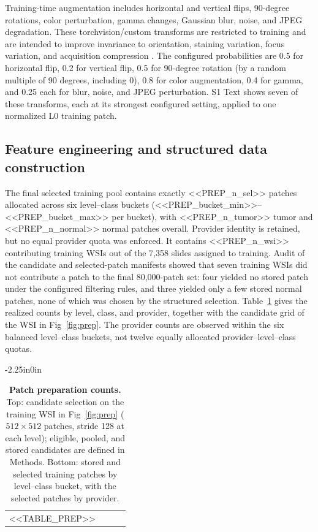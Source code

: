 \documentclass[10pt,letterpaper]{article}
\begin{document}
Training-time augmentation includes horizontal and vertical flips, 90-degree rotations, color perturbation, gamma changes, Gaussian blur, noise, and JPEG degradation. These torchvision/custom transforms are restricted to training and are intended to improve invariance to orientation, staining variation, focus variation, and acquisition compression \cite{bib24}. The configured probabilities are 0.5 for horizontal flip, 0.2 for vertical flip, 0.5 for 90-degree rotation (by a random multiple of 90 degrees, including 0), 0.8 for color augmentation, 0.4 for gamma, and 0.25 each for blur, noise, and JPEG perturbation. S1 Text shows seven of these transforms, each at its strongest configured setting, applied to one normalized L0 training patch.

\subsection*{Feature engineering and structured data construction}
The final selected training pool contains exactly <<PREP_n_sel>> patches allocated across six level--class buckets (<<PREP_bucket_min>>--<<PREP_bucket_max>> per bucket), with <<PREP_n_tumor>> tumor and <<PREP_n_normal>> normal patches overall. Provider identity is retained, but no equal provider quota was enforced. It contains <<PREP_n_wsi>> contributing training WSIs out of the 7,358 slides assigned to training. Audit of the candidate and selected-patch manifests showed that seven training WSIs did not contribute a patch to the final 80,000-patch set: four yielded no stored patch under the configured filtering rules, and three yielded only a few stored normal patches, none of which was chosen by the structured selection. Table~\ref{tab:prep} gives the realized counts by level, class, and provider, together with the candidate grid of the WSI in Fig~\ref{fig:prep}. The provider counts are observed within the six balanced level--class buckets, not twelve equally allocated provider--level--class quotas.

\begin{table}[H]\begin{adjustwidth}{-2.25in}{0in}\centering
\caption{\textbf{Patch preparation counts.} Top: candidate selection on the training WSI in Fig~\ref{fig:prep} ($512\times512$ patches, stride 128 at each level); eligible, pooled, and stored candidates are defined in Methods. Bottom: stored and selected training patches by level--class bucket, with the selected patches by provider.}\label{tab:prep}
\begin{tabular}{lrrr}\toprule
<<TABLE_PREP>>\bottomrule
\end{tabular}\end{adjustwidth}\end{table}
\end{document}
